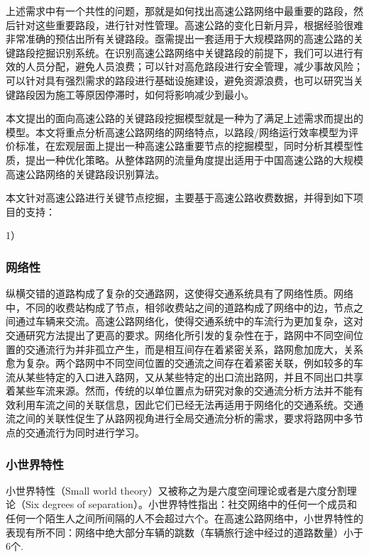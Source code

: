 上述需求中有一个共性的问题，那就是如何找出高速公路网络中最重要的路段，然后针对这些重要路段，进行针对性管理。高速公路的变化日新月异，根据经验很难非常准确的预估出所有关键路段。亟需提出一套适用于大规模路网的高速公路的关键路段挖掘识别系统。在识别高速公路网络中关键路段的前提下，我们可以进行有效的人员分配，避免人员浪费；可以针对高危路段进行安全管理，减少事故风险；可以针对具有强烈需求的路段进行基础设施建设，避免资源浪费，也可以研究当关键路段因为施工等原因停滞时，如何将影响减少到最小。

本文提出的面向高速公路的关键路段挖掘模型就是一种为了满足上述需求而提出的模型。本文将重点分析高速公路网络的网络特点，以路段/网络运行效率模型为评价标准，在宏观层面上提出一种高速公路重要节点的挖掘模型，同时分析其模型性质，提出一种优化策略。从整体路网的流量角度提出适用于中国高速公路的大规模高速公路网络的关键路段识别算法。

本文针对高速公路进行关键节点挖掘，主要基于高速公路收费数据，并得到如下项目的支持：

1）



\subsubsection{网络性}
    纵横交错的道路构成了复杂的交通路网，这使得交通系统具有了网络性质。网络中，不同的收费站构成了节点，相邻收费站之间的道路构成了网络中的边，节点之间通过车辆来交流。高速公路网络化，使得交通系统中的车流行为更加复杂，这对交通研究方法提出了更高的要求。网络化所引发的复杂性在于，路网中不同空间位置的交通流行为并非孤立产生，而是相互间存在着紧密关系，路网愈加庞大，关系愈为复杂。两个路网中不同空间位置的交通流之间存在着紧密关联，例如较多的车流从某些特定的入口进入路网，又从某些特定的出口流出路网，并且不同出口共享着某些车流来源。然而，传统的以单位置点为研究对象的交通流分析方法并不能有效利用车流之间的关联信息，因此它们已经无法再适用于网络化的交通系统。交通流之间的关联性促生了从路网视角进行全局交通流分析的需求，要求将路网中多节点的交通流行为同时进行学习。

\subsubsection{小世界特性}

    小世界特性（Small world theory）又被称之为是六度空间理论或者是六度分割理论（Six degrees of separation）。小世界特性指出：社交网络中的任何一个成员和任何一个陌生人之间所间隔的人不会超过六个。在高速公路网络中，小世界特性的表现有所不同：网络中绝大部分车辆的跳数（车辆旅行途中经过的道路数量）小于6个.
    
